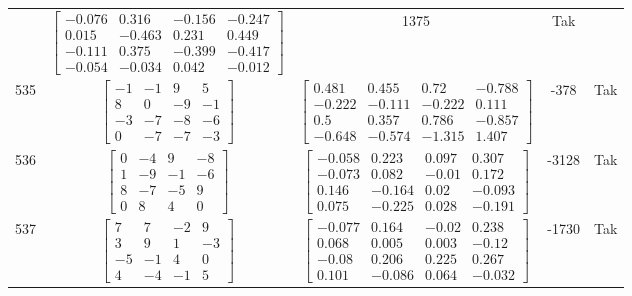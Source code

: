 \documentclass[a4paper,12pt]{article}
\begin{document}
\begin{tabular}{c c c c c}
&
$\begin{bmatrix} -0.076 & 0.316 & -0.156 & -0.247 \\ 0.015 & -0.463 & 0.231 & 0.449 \\ -0.111 & 0.375 & -0.399 & -0.417 \\ -0.054 & -0.034 & 0.042 & -0.012 \end{bmatrix}$
&
1375
&
Tak
\\
535
&
$\begin{bmatrix} -1 & -1 & 9 & 5 \\ 8 & 0 & -9 & -1 \\ -3 & -7 & -8 & -6 \\ 0 & -7 & -7 & -3 \end{bmatrix}$
&
$\begin{bmatrix} 0.481 & 0.455 & 0.72 & -0.788 \\ -0.222 & -0.111 & -0.222 & 0.111 \\ 0.5 & 0.357 & 0.786 & -0.857 \\ -0.648 & -0.574 & -1.315 & 1.407 \end{bmatrix}$
&
-378
&
Tak
\\
536
&
$\begin{bmatrix} 0 & -4 & 9 & -8 \\ 1 & -9 & -1 & -6 \\ 8 & -7 & -5 & 9 \\ 0 & 8 & 4 & 0 \end{bmatrix}$
&
$\begin{bmatrix} -0.058 & 0.223 & 0.097 & 0.307 \\ -0.073 & 0.082 & -0.01 & 0.172 \\ 0.146 & -0.164 & 0.02 & -0.093 \\ 0.075 & -0.225 & 0.028 & -0.191 \end{bmatrix}$
&
-3128
&
Tak
\\
537
&
$\begin{bmatrix} 7 & 7 & -2 & 9 \\ 3 & 9 & 1 & -3 \\ -5 & -1 & 4 & 0 \\ 4 & -4 & -1 & 5 \end{bmatrix}$
&
$\begin{bmatrix} -0.077 & 0.164 & -0.02 & 0.238 \\ 0.068 & 0.005 & 0.003 & -0.12 \\ -0.08 & 0.206 & 0.225 & 0.267 \\ 0.101 & -0.086 & 0.064 & -0.032 \end{bmatrix}$
&
-1730
&
Tak
\\

\end{tabular}
\end{document}
